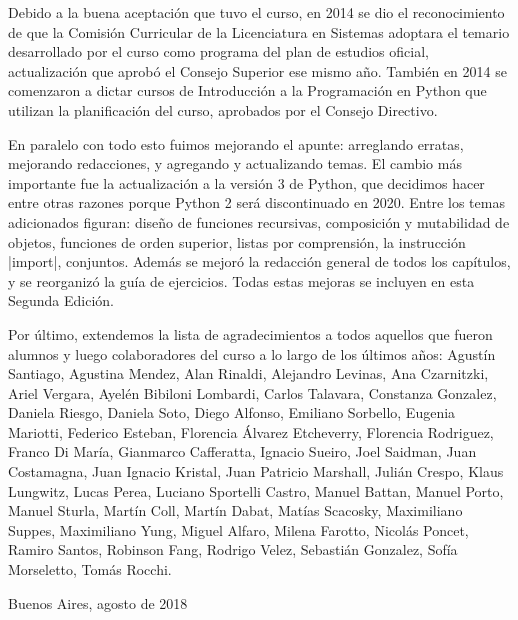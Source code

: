 \begin{center}
\end{center}

Debido a la buena aceptación que tuvo el curso, en 2014 se dio el reconocimiento
de que la Comisión Curricular de la Licenciatura en Sistemas adoptara el temario
desarrollado por el curso como programa del plan de estudios oficial,
actualización que aprobó el Consejo Superior ese mismo año.  También en 2014
se comenzaron a dictar cursos de Introducción a la Programación en Python que
utilizan la planificación del curso, aprobados por el Consejo Directivo.

En paralelo con todo esto fuimos mejorando el apunte: arreglando erratas,
mejorando redacciones, y agregando y actualizando temas. El cambio más
importante fue la actualización a la versión 3 de Python, que decidimos hacer
entre otras razones porque Python 2 será discontinuado en 2020. Entre los
temas adicionados figuran: diseño de funciones recursivas, composición y mutabilidad
de objetos, funciones de orden superior, listas por comprensión, la instrucción
|import|, conjuntos. Además se mejoró la redacción general de todos los capítulos,
y se reorganizó la guía de ejercicios. Todas estas mejoras se incluyen en esta
Segunda Edición.

Por último, extendemos la lista de agradecimientos a todos aquellos que
fueron alumnos y luego colaboradores del curso a lo largo de los últimos años:
Agustín Santiago,
Agustina Mendez,
Alan Rinaldi,
Alejandro Levinas,
Ana Czarnitzki,
Ariel Vergara,
Ayelén Bibiloni Lombardi,
Carlos Talavara,
Constanza Gonzalez,
Daniela Riesgo,
Daniela Soto,
Diego Alfonso,
Emiliano Sorbello,
Eugenia Mariotti,
Federico Esteban,
Florencia Álvarez Etcheverry,
Florencia Rodriguez,
Franco Di María,
Gianmarco Cafferatta,
Ignacio Sueiro,
Joel Saidman,
Juan Costamagna,
Juan Ignacio Kristal,
Juan Patricio Marshall,
Julián Crespo,
Klaus Lungwitz,
Lucas Perea,
Luciano Sportelli Castro,
Manuel Battan,
Manuel Porto,
Manuel Sturla,
Martín Coll,
Martín Dabat,
Matías Scacosky,
Maximiliano Suppes,
Maximiliano Yung,
Miguel Alfaro,
Milena Farotto,
Nicolás Poncet,
Ramiro Santos,
Robinson Fang,
Rodrigo Velez,
Sebastián Gonzalez,
Sofía Morseletto,
Tomás Rocchi.

\vspace{1cm}
\hfill Buenos Aires, agosto de 2018

